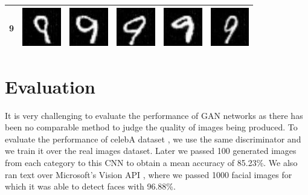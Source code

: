 \begin{table}[H]
\begin{tabular}{|llllll|}
9 & \includegraphics[width=1.69cm, height=1.69cm]{Files/MNIST/1-1.png}  &\includegraphics[width=1.69cm, height=1.69cm]{Files/MNIST/2-3.png}   & \includegraphics[width=1.69cm, height=1.69cm]{Files/MNIST/4-7.png}  & \includegraphics[width=1.69cm, height=1.69cm]{Files/MNIST/6-1.png}  & \includegraphics[width=1.69cm, height=1.69cm]{Files/MNIST/7-3.png} \\ \hline

\end{tabular}
\end{table}



\section{Evaluation}

It is very challenging to evaluate the performance of GAN networks as there has been no comparable method to judge the quality of images being produced.  To evaluate the performance of celebA \cite{celeba} dataset , we use the same discriminator and we train it over the real images dataset. Later we passed 100 generated images from each category to this CNN to obtain a mean accuracy of 85.23\%. We also ran text over Microsoft's Vision API \cite{Microsoft}, where we passed 1000 facial images for which it was able to detect faces with 96.88\%. 